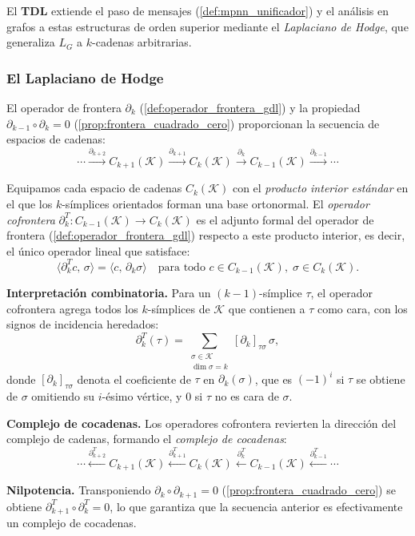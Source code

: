 El \textbf{\gls{TDL}} extiende el paso de mensajes (\autoref{def:mpnn_unificador}) y el análisis en grafos a estas estructuras de orden superior mediante el \textit{Laplaciano de Hodge}, que generaliza $L_G$ a $k$-cadenas arbitrarias.

\subsubsection{El Laplaciano de Hodge}\label{subsubsec:hodge_laplacian_gdl}

El operador de frontera $\partial_k$ (\autoref{def:operador_frontera_gdl}) y la propiedad $\partial_{k-1} \circ \partial_k = 0$ (\autoref{prop:frontera_cuadrado_cero}) proporcionan la secuencia de espacios de cadenas:
\[
	\cdots \xrightarrow{\partial_{k+2}} C_{k+1}(\mathcal{K}) \xrightarrow{\partial_{k+1}} C_k(\mathcal{K}) \xrightarrow{\partial_k} C_{k-1}(\mathcal{K}) \xrightarrow{\partial_{k-1}} \cdots
\]

\begin{definition}\label{def:operador_cofrontera_gdl}
	Equipamos cada espacio de cadenas $C_k(\mathcal{K})$ con el \textit{producto interior estándar} en el que los $k$-símplices orientados forman una base ortonormal. El \textit{operador cofrontera} $\partial_k^T : C_{k-1}(\mathcal{K}) \to C_k(\mathcal{K})$ es el adjunto formal del operador de frontera (\autoref{def:operador_frontera_gdl}) respecto a este producto interior, es decir, el único operador lineal que satisface:
	\[
		\langle \partial_k^T c, \, \sigma \rangle = \langle c, \, \partial_k \sigma \rangle \quad \text{para todo } c \in C_{k-1}(\mathcal{K}),\; \sigma \in C_k(\mathcal{K}).
	\]

	\textbf{Interpretación combinatoria.} Para un $(k{-}1)$-símplice $\tau$, el operador cofrontera agrega todos los $k$-símplices de $\mathcal{K}$ que contienen a $\tau$ como cara, con los signos de incidencia heredados:
	\[
		\partial_k^T(\tau) = \sum_{\substack{\sigma \in \mathcal{K} \\ \dim \sigma = k}} [\partial_k]_{\tau\sigma} \, \sigma,
	\]
	donde $[\partial_k]_{\tau\sigma}$ denota el coeficiente de $\tau$ en $\partial_k(\sigma)$, que es $(-1)^i$ si $\tau$ se obtiene de $\sigma$ omitiendo su $i$-ésimo vértice, y $0$ si $\tau$ no es cara de $\sigma$.

	\textbf{Complejo de cocadenas.} Los operadores cofrontera revierten la dirección del complejo de cadenas, formando el \textit{complejo de cocadenas}:
	\[
		\cdots \xleftarrow{\partial_{k+2}^T} C_{k+1}(\mathcal{K}) \xleftarrow{\partial_{k+1}^T} C_k(\mathcal{K}) \xleftarrow{\partial_k^T} C_{k-1}(\mathcal{K}) \xleftarrow{\partial_{k-1}^T} \cdots
	\]

	\textbf{Nilpotencia.} Transponiendo $\partial_{k} \circ \partial_{k+1} = 0$ (\autoref{prop:frontera_cuadrado_cero}) se obtiene $\partial_{k+1}^T \circ \partial_k^T = 0$, lo que garantiza que la secuencia anterior es efectivamente un complejo de cocadenas.
\end{definition}


